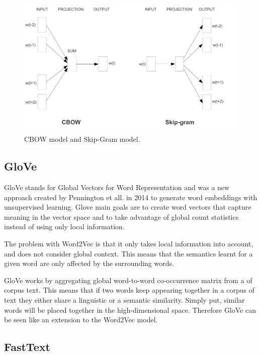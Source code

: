        \begin{figure}[htb]
            \centering
            \includegraphics[scale = 0.15]{Sections/3StateOfTheArt/3_images/Cbow_Skip.png}
            \caption{CBOW model and Skip-Gram model. \cite{Mikolov2013}} 
        \end{figure}

        
        \subsection{GloVe}
            \par GloVe stands for Global Vectors for Word Representation and was a new approach created by Pennington et all. in 2014 \cite{Pennington2014} to generate word embeddings with unsupervised learning. Glove main goals are to create word vectors that capture meaning in the vector space and to take advantage of global count statistics instead of using only local information. 
            \par The problem with Word2Vec is that it only takes local information into account, and does not consider global context. This means that the semantics learnt for a given word are only affected by the surrounding words. 
            \par GloVe works by aggregating global word-to-word co-occurrence matrix from a of corpus text. This means that if two words keep appearing together in a corpus of text they either share a linguistic or a semantic similarity. Simply put, similar words will be placed together in the high-dimensional space. Therefore GloVe can be seen like an extension to the Word2Vec model.

        \subsection{FastText}

